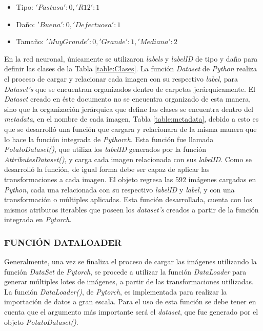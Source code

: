\begin{itemize}
	\item Tipo: ${'Pastusa': 0, 'R12': 1}$
	\item Daño: ${'Buena': 0, 'Defectuosa': 1}$
	\item Tamaño: ${'Muy Grande': 0, 'Grande': 1, 'Mediana': 2}$
\end{itemize}

En la red neuronal, únicamente se utilizaron \textit{labels} y \textit{labelID} de tipo y daño para definir las clases de la Tabla \ref{table:Clases}. La función \textit{Dataset} de \textit{Python} realiza el proceso de cargar y relacionar cada imagen con su respectivo \textit{label}, para \textit{Dataset's} que se encuentran organizados dentro de carpetas jerárquicamente. El \textit{Dataset} creado en éste documento no se encuentra organizado de esta manera, sino que la organización jerárquica que define las clases se encuentra dentro del \textit{metadata}, en el nombre de cada imagen, Tabla \ref{table:metadata}, debido a esto es que se desarrolló una función que cargara y relacionara de la misma manera que lo hace la función integrada de \textit{Pythorch}. Esta función fue llamada \textit{PotatoDataset()}, que utiliza los \textit{labelID} generados por la función \textit{AttributesDataset()}, y carga cada imagen relacionada con sus \textit{labelID}. Como se desarrolló la función, de igual forma debe ser capaz de aplicar las transformaciones a cada imagen. El objeto regresa las 592 imágenes cargadas en \textit{Python}, cada una relacionada con su respectivo \textit{labelID} y \textit{label}, y con una transformación o múltiples aplicadas. Esta función desarrollada, cuenta con los mismos atributos iterables que poseen los \textit{dataset's} creados a partir de la función integrada en \textit{Pytorch}.			


\subsubsection{FUNCIÓN DATALOADER}			

Generalmente, una vez se finaliza el proceso de cargar las imágenes utilizando la función \textit{DataSet} de \textit{Pytorch}, se procede a utilizar la función \textit{DataLoader} para generar múltiples lotes de imágenes, a partir de las transformaciones utilizadas. La función \textit{DataLoader()}, de \textit{Pytorch}, es implementada para realizar la importación de datos a gran escala. Para el uso de esta función se debe tener en cuenta que el argumento más importante será el \textit{dataset}, que fue generado por el objeto \textit{PotatoDataset()}. \\

